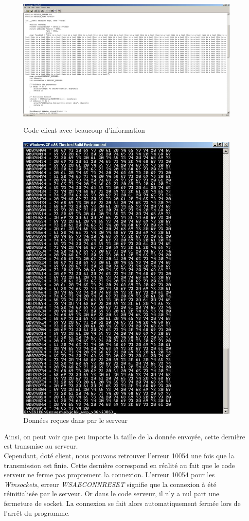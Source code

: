 \begin{figure}[H]
  \centering
  \begin{minipage}{.45\textwidth}
    \includegraphics[width=.9\textwidth]{img/50.JPG}
    \captionsetup{justification=centering}
    \caption{Code client avec beaucoup d'information}
  \end{minipage}
  \begin{minipage}{.45\textwidth}
    \includegraphics[width=.9\textwidth]{img/53.JPG}
    \captionsetup{justification=centering}
    \caption{Données reçues dans par le serveur}
  \end{minipage}
\end{figure}
Ainsi, on peut voir que peu importe la taille de la donnée envoyée, cette dernière est transmise au serveur.\\
Cependant, doté client, nous pouvons retrouver l'erreur 10054 une fois que la transmission est finie. Cette dernière correspond en réalité au fait que le code serveur ne ferme pas proprement la connexion. L'erreur 10054 pour les \textit{Winsockets}, erreur \textit{WSAECONNRESET} signifie que la connexion à été réinitialisée par le serveur. Or dans le code serveur, il n'y a nul part une fermeture de socket. La connexion se fait alors automatiquement fermée lors de l’arrêt du programme.
